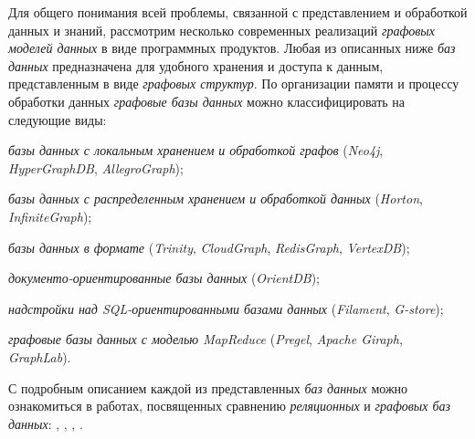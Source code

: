 Для общего понимания всей проблемы, связанной с представлением и обработкой данных и знаний, рассмотрим несколько современных реализаций \textit{графовых моделей данных} в виде программных продуктов. Любая из описанных ниже \textit{баз данных} предназначена для удобного хранения и доступа к данным, представленным в виде \textit{графовых структур}. По организации памяти и процессу обработки данных \textit{графовые базы данных} можно классифицировать на следующие виды:
\begin{textitemize}
    \item \textit{базы данных с локальным хранением и обработкой графов} (\textit{Neo4j}, \textit{HyperGraphDB}, \textit{AllegroGraph});
    \item \textit{базы данных с распределенным хранением и обработкой данных} (\textit{Horton}, \textit{InfiniteGraph});
    \item \textit{базы данных в формате } (\textit{Trinity}, \textit{CloudGraph}, \textit{RedisGraph}, \textit{VertexDB});
    \item \textit{документо-ориентированные базы данных} (\textit{OrientDB});
    \item \textit{надстройки над SQL-ориентированными базами данных} (\textit{Filament}, \textit{G-store});
    \item \textit{графовые базы данных с моделью MapReduce} (\textit{Pregel}, \textit{Apache Giraph}, \textit{GraphLab}).
\end{textitemize}

С подробным описанием каждой из представленных \textit{баз данных} можно ознакомиться в работах, посвященных сравнению \textit{реляционных} и \textit{графовых баз данных}: , , , .

